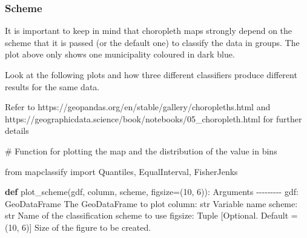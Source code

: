 \documentclass[
  letterpaper,
  DIV=11,
  numbers=noendperiod]{scrreprt}
\newenvironment{Shaded}{\begin{snugshade}}{\end{snugshade}}
\newcommand{\CommentTok}[1]{\textcolor[rgb]{0.37,0.37,0.37}{#1}}
\newcommand{\DecValTok}[1]{\textcolor[rgb]{0.68,0.00,0.00}{#1}}
\newcommand{\ImportTok}[1]{\textcolor[rgb]{0.00,0.46,0.62}{#1}}
\newcommand{\KeywordTok}[1]{\textcolor[rgb]{0.00,0.23,0.31}{\textbf{#1}}}
\newcommand{\NormalTok}[1]{\textcolor[rgb]{0.00,0.23,0.31}{#1}}
\newcommand{\OperatorTok}[1]{\textcolor[rgb]{0.37,0.37,0.37}{#1}}
\begin{document}
\subsubsection{Scheme}\label{scheme}

It is important to keep in mind that choropleth maps strongly depend on
the scheme that it is passed (or the default one) to classify the data
in groups. The plot above only shows one municipality coloured in dark
blue.

Look at the following plots and how three different classifiers produce
different results for the same data.

Refer to https://geopandas.org/en/stable/gallery/choropleths.html and
https://geographicdata.science/book/notebooks/05\_choropleth.html for
further details

\begin{Shaded}
\begin{Highlighting}[]
\CommentTok{\# Function for plotting the map and the distribution of the value in bins  }

\ImportTok{from}\NormalTok{ mapclassify }\ImportTok{import}\NormalTok{ Quantiles, EqualInterval, FisherJenks}

\KeywordTok{def}\NormalTok{ plot\_scheme(gdf, column, scheme, figsize}\OperatorTok{=}\NormalTok{(}\DecValTok{10}\NormalTok{, }\DecValTok{6}\NormalTok{)):}
    \CommentTok{\textquotesingle{}\textquotesingle{}\textquotesingle{}}
\CommentTok{    Arguments}
\CommentTok{    {-}{-}{-}{-}{-}{-}{-}{-}{-}}
\CommentTok{    gdf: GeoDataFrame}
\CommentTok{        The GeoDataFrame to plot}
\CommentTok{    column: str}
\CommentTok{        Variable name }
\CommentTok{    scheme: str}
\CommentTok{        Name of the classification scheme to use }
\CommentTok{    figsize: Tuple}
\CommentTok{        [Optional. Default = (10, 6)] Size of the figure to be created.}


\end{Highlighting}
\end{Shaded}
\end{document}
